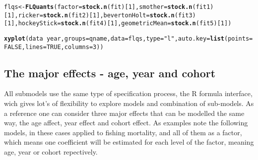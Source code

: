 \documentclass[a4paper,english,10pt]{article}\usepackage[]{graphicx}\usepackage[]{color}
\makeatletter
\newcommand{\hlnum}[1]{\textcolor[rgb]{0.686,0.059,0.569}{#1}}%
\newcommand{\hlstr}[1]{\textcolor[rgb]{0.192,0.494,0.8}{#1}}%
\newcommand{\hlopt}[1]{\textcolor[rgb]{0,0,0}{#1}}%
\newcommand{\hlstd}[1]{\textcolor[rgb]{0.345,0.345,0.345}{#1}}%
\newcommand{\hlkwb}[1]{\textcolor[rgb]{0.69,0.353,0.396}{#1}}%
\newcommand{\hlkwc}[1]{\textcolor[rgb]{0.333,0.667,0.333}{#1}}%
\newcommand{\hlkwd}[1]{\textcolor[rgb]{0.737,0.353,0.396}{\textbf{#1}}}%
\newenvironment{kframe}{%
 \def\at@end@of@kframe{}%
 \ifinner\ifhmode%
  \def\at@end@of@kframe{\end{minipage}}%
  \begin{minipage}{\columnwidth}%
 \fi\fi%
 \def\FrameCommand##1{\hskip\@totalleftmargin \hskip-\fboxsep
 \colorbox{shadecolor}{##1}\hskip-\fboxsep
     \hskip-\linewidth \hskip-\@totalleftmargin \hskip\columnwidth}%
 \MakeFramed {\advance\hsize-\width
   \@totalleftmargin\z@ \linewidth\hsize
   \@setminipage}}%
 {\par\unskip\endMakeFramed%
 \at@end@of@kframe}
\newenvironment{knitrout}{}{} %
\makeatother
\begin{document}
\begin{knitrout}
\begin{kframe}
{\ttfamily\noindent\bfseries{}}\begin{alltt}
\hlstd{flqs} \hlkwb{<-} \hlkwd{FLQuants}\hlstd{(}\hlkwc{factor}\hlstd{=}\hlkwd{stock.n}\hlstd{(fit)[}\hlnum{1}\hlstd{],} \hlkwc{smother}\hlstd{=}\hlkwd{stock.n}\hlstd{(fit1)[}\hlnum{1}\hlstd{],} \hlkwc{ricker}\hlstd{=}\hlkwd{stock.n}\hlstd{(fit2)[}\hlnum{1}\hlstd{],} \hlkwc{bevertonHolt}\hlstd{=}\hlkwd{stock.n}\hlstd{(fit3)[}\hlnum{1}\hlstd{],} \hlkwc{hockeyStick}\hlstd{=}\hlkwd{stock.n}\hlstd{(fit4)[}\hlnum{1}\hlstd{],} \hlkwc{geometricMean}\hlstd{=}\hlkwd{stock.n}\hlstd{(fit5)[}\hlnum{1}\hlstd{])}
\end{alltt}


{\ttfamily\noindent\bfseries{}}\end{kframe}
\end{knitrout}

\begin{knitrout}
\color{fgcolor}\begin{kframe}
\begin{alltt}
\hlkwd{xyplot}\hlstd{(data}\hlopt{~}\hlstd{year,} \hlkwc{groups}\hlstd{=qname,} \hlkwc{data}\hlstd{=flqs,} \hlkwc{type}\hlstd{=}\hlstr{"l"}\hlstd{,} \hlkwc{auto.key}\hlstd{=}\hlkwd{list}\hlstd{(}\hlkwc{points}\hlstd{=}\hlnum{FALSE}\hlstd{,} \hlkwc{lines}\hlstd{=}\hlnum{TRUE}\hlstd{,} \hlkwc{columns}\hlstd{=}\hlnum{3}\hlstd{))}
\end{alltt}


{\ttfamily\noindent\bfseries{}}\end{kframe}
\end{knitrout}

\subsection{The major effects - age, year and cohort}

All submodels use the same type of specification process, the R formula interface, wich gives lot's of flexibility to explore models and combination of sub-models. As a reference one can consider three major effects that can be modelled the same way, the age affect, year effect and cohort effect. As examples note the following models, in these cases applied to fishing mortality, and all of them as a factor, which means one coefficient will be estimated for each level of the factor, meaning age, year or cohort repectively.
\end{document}
